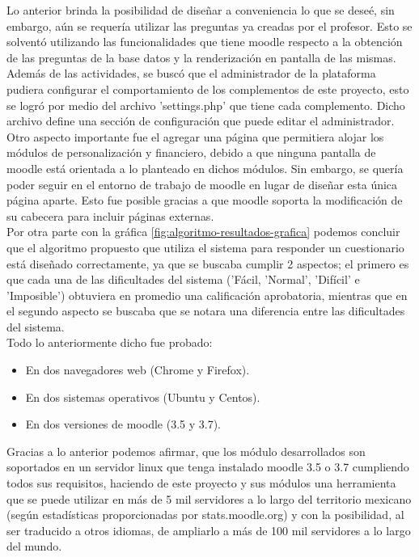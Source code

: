 \noindent Lo anterior brinda la posibilidad de diseñar a conveniencia lo que se deseé, sin embargo, aún se requería utilizar las preguntas
ya creadas por el profesor. Esto se solventó utilizando las funcionalidades que tiene moodle respecto a la obtención de las preguntas
de la base datos y la renderización en pantalla de las mismas.\\

\noindent Además de las actividades, se buscó que el administrador de la plataforma pudiera configurar el comportamiento
de los complementos de este proyecto, esto se logró por medio del archivo 'settings.php' que tiene cada complemento. Dicho archivo
define una sección de configuración que puede editar el administrador.\\

\noindent Otro aspecto importante fue el agregar una página que permitiera alojar los módulos de personalización y financiero, 
debido a que ninguna pantalla de moodle está orientada a lo planteado en dichos módulos. Sin embargo, se quería poder seguir en el entorno de trabajo
de moodle en lugar de diseñar esta única página aparte. Esto fue posible gracias a que moodle soporta la modificación
de su cabecera para incluir páginas externas.\\


\noindent Por otra parte con la gráfica \ref{fig:algoritmo-resultados-grafica} podemos concluir que el algoritmo propuesto
 que utiliza el sistema para responder un cuestionario
está diseñado correctamente, ya que se buscaba cumplir 2 aspectos;
el primero es que cada una de las dificultades del sistema ('Fácil, 'Normal', 'Difícil' e 'Imposible') 
obtuviera en promedio una calificación aprobatoria, mientras que en el segundo aspecto
se buscaba que se notara una diferencia entre las dificultades del sistema.\\


\noindent Todo lo anteriormente dicho fue probado:
\begin{itemize}
    \item  En dos navegadores web (Chrome y Firefox).
    \item  En dos sistemas operativos (Ubuntu  y Centos).
    \item  En dos versiones de moodle (3.5 y 3.7).
\end{itemize}

\noindent Gracias a lo anterior podemos afirmar, que los módulo desarrollados son soportados en un
servidor linux que tenga instalado moodle 3.5 o 3.7 cumpliendo todos sus requisitos, haciendo de este proyecto y sus módulos una herramienta que se puede utilizar
en más de 5 mil servidores a lo largo del territorio mexicano (según estadísticas proporcionadas por stats.moodle.org) y con la posibilidad,
al ser traducido a otros idiomas, de ampliarlo a más de 100 mil servidores a lo largo del mundo.\\

